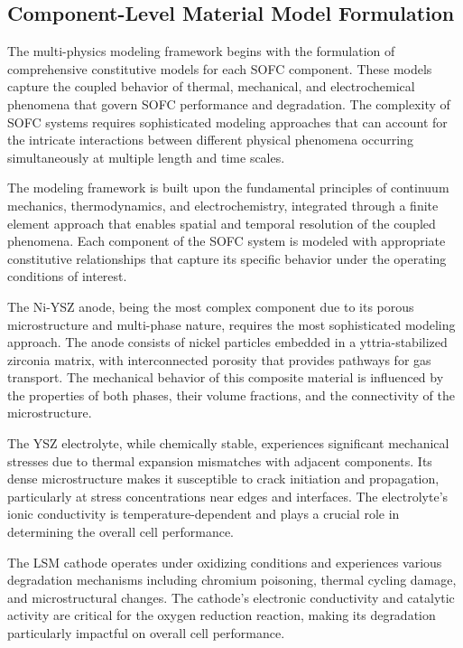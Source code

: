 \documentclass[conference]{IEEEtran}
\begin{document}
\subsection{Component-Level Material Model Formulation}

The multi-physics modeling framework begins with the formulation of comprehensive constitutive models for each SOFC component. These models capture the coupled behavior of thermal, mechanical, and electrochemical phenomena that govern SOFC performance and degradation. The complexity of SOFC systems requires sophisticated modeling approaches that can account for the intricate interactions between different physical phenomena occurring simultaneously at multiple length and time scales.

The modeling framework is built upon the fundamental principles of continuum mechanics, thermodynamics, and electrochemistry, integrated through a finite element approach that enables spatial and temporal resolution of the coupled phenomena. Each component of the SOFC system is modeled with appropriate constitutive relationships that capture its specific behavior under the operating conditions of interest.

The Ni-YSZ anode, being the most complex component due to its porous microstructure and multi-phase nature, requires the most sophisticated modeling approach. The anode consists of nickel particles embedded in a yttria-stabilized zirconia matrix, with interconnected porosity that provides pathways for gas transport. The mechanical behavior of this composite material is influenced by the properties of both phases, their volume fractions, and the connectivity of the microstructure.

The YSZ electrolyte, while chemically stable, experiences significant mechanical stresses due to thermal expansion mismatches with adjacent components. Its dense microstructure makes it susceptible to crack initiation and propagation, particularly at stress concentrations near edges and interfaces. The electrolyte's ionic conductivity is temperature-dependent and plays a crucial role in determining the overall cell performance.

The LSM cathode operates under oxidizing conditions and experiences various degradation mechanisms including chromium poisoning, thermal cycling damage, and microstructural changes. The cathode's electronic conductivity and catalytic activity are critical for the oxygen reduction reaction, making its degradation particularly impactful on overall cell performance.
\end{document}
